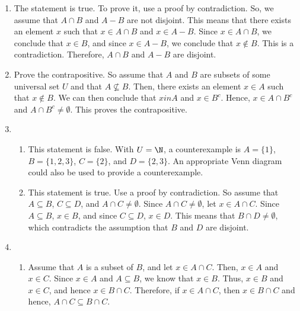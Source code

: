 \begin{enumerate}

\item The statement is true.  To prove it, use a proof by contradiction.  So, we assume that 
$A \cap B$ and $A - B$ are not disjoint.  This means that there exists an element $x$ such that 
$x \in A \cap B$ and $x \in A - B$.  Since $x \in A \cap B$, we conclude that $x \in B$, and since $x \in A - B$, we conclude that $x \notin B$.  This is a contradiction.  Therefore, 
$A \cap B$ and $A - B$ are disjoint.


\item Prove the contrapositive.  So assume that $A$ and $B$ are subsets of some universal set $U$ and that $A \not \subseteq B$.  Then, there exists an element $x \in A$ such that $x \notin B$.  We can then conclude that $x in A$ and $x \in B^c$.  Hence, $x \in A \cap B^c$ and $A \cap B^c \ne \emptyset$.  This proves the contrapositive.




\item \begin{enumerate}
\item This statement is false.  With $U = \N$, a counterexample is $A = \{1\}$, 
$B = \{ 1, 2, 3 \}$, $C = \{ 2 \}$, and $D = \{ 2, 3 \}$.  An appropriate Venn diagram could also be used to provide a counterexample.

\item This statement is true.  Use a proof by contradiction.  So assume that $A \subseteq B$, $C \subseteq D$, and 
$A \cap C \ne \emptyset$.  Since $A \cap C \ne \emptyset$, let $x \in A \cap C$.  Since $A \subseteq B$, $x \in B$, and since $C \subseteq D$, $x \in D$. This means that $B \cap D \ne \emptyset$, which contradicts the assumption that $B$ and $D$ are disjoint.
\end{enumerate}


\item \begin{enumerate}
\item Assume that $A$ is a subset of $B$, and let $x \in A \cap C$.  Then, $x \in A$ and 
$x \in C$.  Since $x \in A$ and $A \subseteq B$, we know that $x \in B$.  Thus, $x \in B$ and 
$x \in C$, and hence $x \in B \cap C$.  Therefore, if $x \in A \cap C$, then $x \in B \cap C$ and hence, $A \cap C \subseteq B \cap C$.


\end{enumerate}
\end{enumerate}
